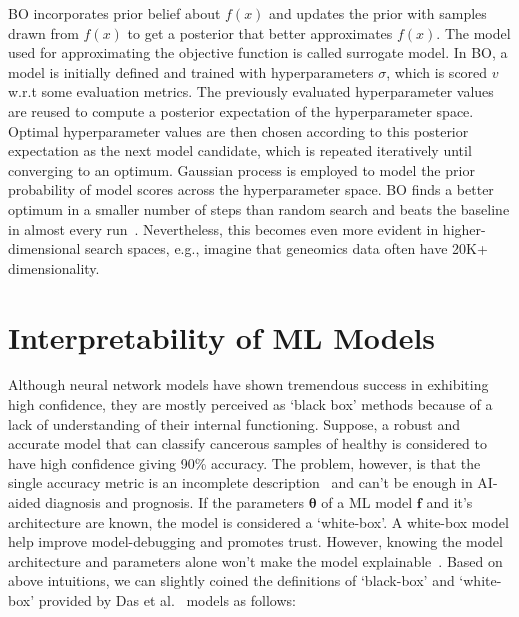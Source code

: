 \hspace*{3.5mm} BO incorporates prior belief about $f(x)$ and updates the prior with samples drawn from $f(x)$ to get a posterior that better approximates $f(x)$. The model used for approximating the objective function is called surrogate model. In BO, a model is initially defined and trained with hyperparameters $\sigma$, which is scored $v$ w.r.t some evaluation metrics. The previously evaluated hyperparameter values are reused to compute a posterior expectation of the hyperparameter space. Optimal hyperparameter values are then chosen according to this posterior expectation as the next model candidate, which is repeated iteratively until converging to an optimum. Gaussian process is employed to model the prior probability of model scores across the hyperparameter space. 
BO finds a better optimum in a smaller number of steps than random search and beats the baseline in almost every run~\cite{BO}. Nevertheless, this becomes even more evident in higher-dimensional search spaces, e.g., imagine that geneomics data often have 20K+ dimensionality. 

\section{Interpretability of ML Models}
Although neural network models have shown tremendous success in exhibiting high confidence, they are mostly perceived as `black box' methods because of a lack of understanding of their internal functioning. Suppose, a robust and accurate model that can classify cancerous samples of healthy is considered to have high confidence giving 90\% accuracy. The problem, however, is that the single accuracy metric is an incomplete description~\cite{doshi2017towards} and can't be enough in AI-aided diagnosis and prognosis. If the parameters $\boldsymbol{\theta}$ of a ML model $\boldsymbol{f}$ and it's architecture are known, the model is considered a `white-box'. A white-box model help improve model-debugging and promotes trust. However, knowing the model architecture and parameters alone won't make the model explainable~\cite{das2020opportunities}.
Based on above intuitions, we can slightly coined the definitions of `black-box' and `white-box' provided by Das et al.~\cite{das2020opportunities} models as follows: 

